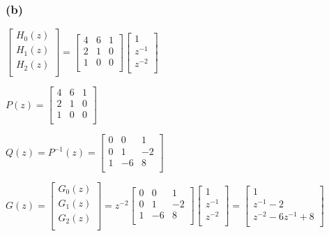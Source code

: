 \documentclass{article}
\begin{document}
\subsubsection*{(b)}
$\begin{bmatrix}
H_{0}(z)\\
H_{1}(z)\\
H_{2}(z)\\
\end{bmatrix}=\begin{bmatrix}
4 &6 &1\\
2 &1 &0\\
1 &0 &0\\
\end{bmatrix}\begin{bmatrix}
1\\
z^{-1}\\
z^{-2}\\
\end{bmatrix}$\par\indent
\par\indent\par
$P(z)=\begin{bmatrix}
4 &6 &1\\
2 &1 &0\\
1 &0 &0\\
\end{bmatrix}$\par\indent
\par\indent
\par
$Q(z)=P^{-1}(z)=\begin{bmatrix}
0 &0 &1\\
0 &1 &-2\\
1 &-6 &8\\
\end{bmatrix}$\par\indent
\par\indent
\par
$G(z)=\begin{bmatrix}
G_{0}(z)\\
G_{1}(z)\\
G_{2}(z)\\
\end{bmatrix}=z^{-2}\begin{bmatrix}
0 &0 &1\\
0 &1 &-2\\
1 &-6 &8\\
\end{bmatrix}\begin{bmatrix}
1\\
z^{-1}\\
z^{-2}\\
\end{bmatrix}=\begin{bmatrix}
1\\
z^{-1}-2\\
z^{-2}-6z^{-1}+8\\
\end{bmatrix}$\par
\end{document}

